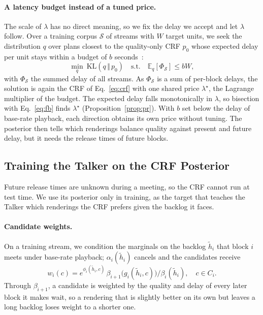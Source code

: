 \paragraph{A latency budget instead of a tuned price.} The scale of $\lambda$ has no direct meaning, so we fix the delay
we accept and let $\lambda$ follow. Over a training corpus $\mathcal{S}$ of streams with $W$ target units, we seek the
distribution $q$ over plans closest to the quality-only CRF $p_0$ whose expected delay per unit stays within a budget
of $b$ seconds~\citep{ganchev2010posterior}:
\begin{equation}
\min_q\ \mathrm{KL}(q\,\Vert\,p_0)\quad\text{s.t.}\quad\mathbb{E}_q[\Phi_\mathcal{S}]\le bW,
\label{eq:pr}
\end{equation}
with $\Phi_\mathcal{S}$ the summed delay of all streams. As $\Phi_\mathcal{S}$ is a sum of per-block delays, the
solution is again the CRF of Eq.~\eqref{eq:crf} with one shared price $\lambda^\star$, the Lagrange multiplier of the
budget. The expected delay falls monotonically in $\lambda$, so bisection with Eq.~\eqref{eq:fb} finds $\lambda^\star$
(Proposition~\ref{prop:pr}). With $b$ set below the delay of base-rate playback, each direction obtains its own price
without tuning. The posterior then tells which renderings balance quality against present and future delay, but it
needs the release times of future blocks.

\subsection{Training the Talker on the CRF Posterior}
\label{sec:method-train}

Future release times are unknown during a meeting, so the CRF cannot run at test time. We use its posterior only in
training, as the target that teaches the Talker which renderings the CRF prefers given the backlog it faces.

\paragraph{Candidate weights.} On a training stream, we condition the marginals on the backlog $\tilde h_i$ that block
$i$ meets under base-rate playback; $\alpha_i(\tilde h_i)$ cancels and the candidates receive
\begin{equation}
w_i(c)=e^{\phi_i(\tilde h_i,c)}\,\beta_{i+1}\big(g_i(\tilde h_i,c)\big)\big/\beta_i(\tilde h_i),\quad c\in C_i.
\label{eq:w}
\end{equation}
Through $\beta_{i+1}$, a candidate is weighted by the quality and delay of every later block it makes wait, so a
rendering that is slightly better on its own but leaves a long backlog loses weight to a shorter one.

